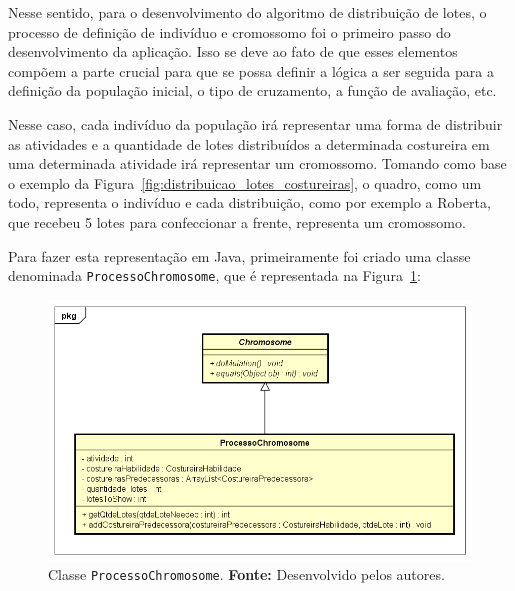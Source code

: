\par Nesse sentido, para o desenvolvimento do algoritmo de distribuição de
lotes, o processo de definição de indivíduo e cromossomo foi o primeiro passo do desenvolvimento da aplicação. Isso se
deve ao fato de que esses elementos compõem a parte crucial para que se
possa definir a lógica a ser seguida para a definição da população inicial, o
tipo de cruzamento, a função de avaliação, etc.

\par Nesse caso, cada indivíduo da população irá representar uma forma de
distribuir as atividades e a quantidade de lotes distribuídos a determinada
costureira em uma determinada atividade irá representar um cromossomo. 
Tomando como base o exemplo da Figura~\ref{fig:distribuicao_lotes_costureiras},
o quadro, como um todo, representa o indivíduo e cada distribuição, como por exemplo a Roberta, que recebeu 5 
lotes para confeccionar a frente, representa um cromossomo.

\par Para fazer esta representação em Java, primeiramente foi criado uma classe denominada \texttt{ProcessoChromosome}, que é
representada na Figura~\ref{fig:class_processoChromosome}:

\begin{figure}[h!]
	\centerline{\includegraphics[scale=0.5]{./imagens/processo_chromosome_diagram.png}}
	\caption[Classe \texttt{ProcessoChromosome}.]
	{Classe \texttt{ProcessoChromosome}. \textbf{Fonte:} Desenvolvido pelos
	autores.}
	\label{fig:class_processoChromosome}
\end{figure}


